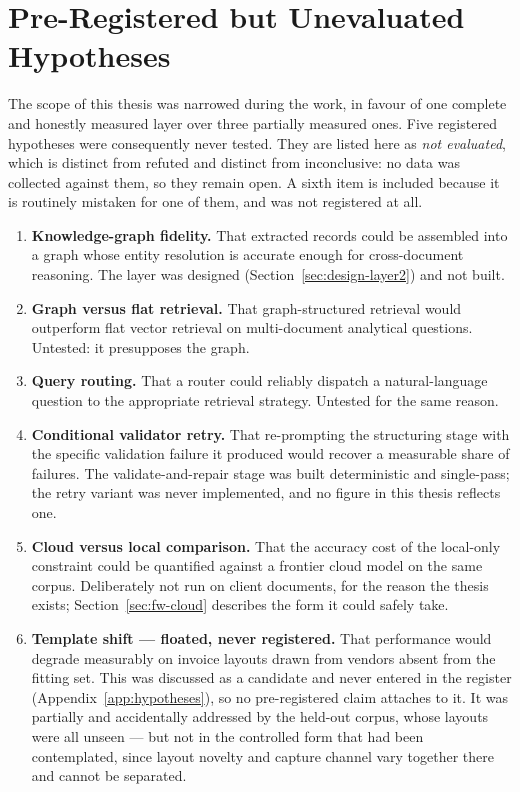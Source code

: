 \section{Pre-Registered but Unevaluated Hypotheses}
\label{sec:unevaluated}

The scope of this thesis was narrowed during the work, in favour of one complete and honestly
measured layer over three partially measured ones. Five registered hypotheses were consequently
never tested. They are listed here as \emph{not evaluated}, which is distinct from refuted and
distinct from inconclusive: no data was collected against them, so they remain open. A sixth item
is included because it is routinely mistaken for one of them, and was not registered at all.

\begin{enumerate}
  \item \textbf{Knowledge-graph fidelity.} That extracted records could be assembled into a
        graph whose entity resolution is accurate enough for cross-document reasoning. The layer
        was designed (Section~\ref{sec:design-layer2}) and not built.
  \item \textbf{Graph versus flat retrieval.} That graph-structured retrieval would outperform
        flat vector retrieval on multi-document analytical questions. Untested: it presupposes
        the graph.
  \item \textbf{Query routing.} That a router could reliably dispatch a natural-language question
        to the appropriate retrieval strategy. Untested for the same reason.
  \item \textbf{Conditional validator retry.} That re-prompting the structuring stage with the
        specific validation failure it produced would recover a measurable share of failures. The
        validate-and-repair stage was built deterministic and single-pass; the retry variant was
        never implemented, and no figure in this thesis reflects one.
  \item \textbf{Cloud versus local comparison.} That the accuracy cost of the local-only
        constraint could be quantified against a frontier cloud model on the same corpus.
        Deliberately not run on client documents, for the reason the thesis exists;
        Section~\ref{sec:fw-cloud} describes the form it could safely take.
  \item \textbf{Template shift --- floated, never registered.} That performance would degrade
        measurably on invoice layouts drawn from vendors absent from the fitting set. This was
        discussed as a candidate and never entered in the register
        (Appendix~\ref{app:hypotheses}), so no pre-registered claim attaches to it. It was
        partially and accidentally addressed by the held-out corpus, whose layouts were all
        unseen --- but not in the controlled form that had been contemplated, since layout
        novelty and capture channel vary together there and cannot be separated.
\end{enumerate}

